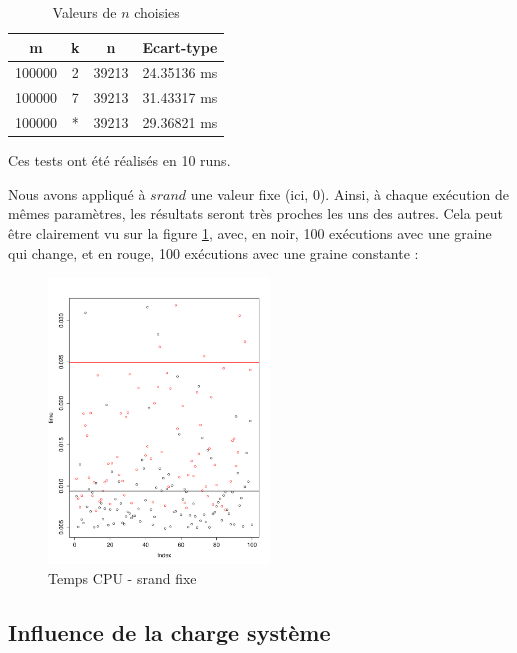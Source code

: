 

\begin{table}[H]
	\centering
	\caption{Valeurs de $n$ choisies}
	\label{tab:ecartTypesTemps}
	\begin{tabular}{ccc|c}
		\toprule
		m & k & n & Ecart-type\\
		\midrule
		100000 & 2 & 39213 & 24.35136 ms\\
		100000 & 7 & 39213 & 31.43317 ms\\
		100000 & * & 39213 & 29.36821 ms\\
		\bottomrule
	\end{tabular}
\end{table}


Ces tests ont été réalisés en 10 runs.
\newline



Nous avons appliqué à $srand$ une valeur fixe (ici, 0). Ainsi, à chaque exécution de mêmes paramètres, les résultats seront très proches les uns des autres. Cela peut être clairement vu sur la figure \ref{fig:timeStochasticite}, avec, en noir, 100 exécutions avec une graine qui change, et en rouge, 100 exécutions avec une graine constante :

\begin{figure}[H]
	\begin{center}
		\includegraphics[height=7.6cm]{diagrams/time_serial_paral.pdf}
		\caption{Temps CPU - srand fixe}
		\label{fig:timeStochasticite}
	\end{center}
\end{figure}

\subsection{Influence de la charge système}


